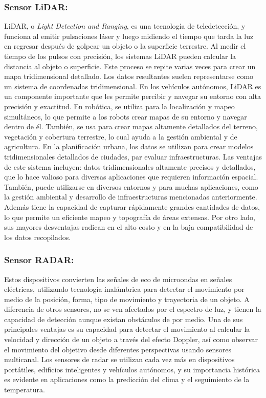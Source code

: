 \subsubsection*{Sensor LiDAR:}


LiDAR, o \textit{Light Detection and Ranging}, es una tecnología de teledetección, y funciona al emitir pulsaciones láser y luego midiendo el tiempo que tarda la luz en regresar después de golpear un objeto o la superficie terrestre. Al medir el tiempo de los pulsos con precisión, los sistemas LiDAR pueden calcular la distancia al objeto o superficie. Este proceso se repite varias veces para crear un mapa tridimensional detallado. Los datos resultantes suelen representarse como un sistema de coordenadas tridimensional. En los vehículos autónomos, LiDAR es un componente importante que les permite percibir y navegar su entorno con alta precisión y exactitud. En robótica, se utiliza para la localización y mapeo simultáneos, lo que permite a los robots crear mapas de su entorno y navegar dentro de él. También, se usa para crear mapas altamente detallados del terreno, vegetación y cobertura terrestre, lo cual ayuda a la gestión ambiental y de agricultura. En la planificación urbana, los datos se utilizan para crear modelos tridimensionales detallados de ciudades, par evaluar infraestructuras. Las ventajas de este sistema incluyen: datos tridimensionales altamente precisos y detallados, que lo hace valioso para diversas aplicaciones que requieren información espacial. También, puede utilizarse en diversos entornos y para muchas aplicaciones, como la gestión ambiental y desarrollo de infraestructuras mencionadas anteriormente. Además tiene la capacidad de capturar rápidamente grandes cantidades de datos, lo que permite un eficiente mapeo y topografía de áreas extensas. Por otro lado, sus mayores desventajas radican en el alto costo y en la baja compatibilidad de los datos recopilados. \cite{XinWang}

\subsubsection*{Sensor RADAR:}
Estos dispositivos convierten las señales de eco de microondas en señales eléctricas, utilizando tecnología inalámbrica para detectar el movimiento por medio de la posición, forma, tipo de movimiento y trayectoria de un objeto. A diferencia de otros sensores, no se ven afectados por el espectro de luz, y tienen la capacidad de detección aunque existan obstáculos de por medio. Una de sus principales ventajas es su capacidad para detectar el movimiento al calcular la velocidad y dirección de un objeto a través del efecto Doppler, así como observar el movimiento del objetivo desde diferentes perspectivas usando sensores multicanal. Los sensores de radar se utilizan cada vez más en dispositivos portátiles, edificios inteligentes y vehículos autónomos, y su importancia histórica es evidente en aplicaciones como la predicción del clima y el seguimiento de la temperatura.  \cite{Atwell_2021}

